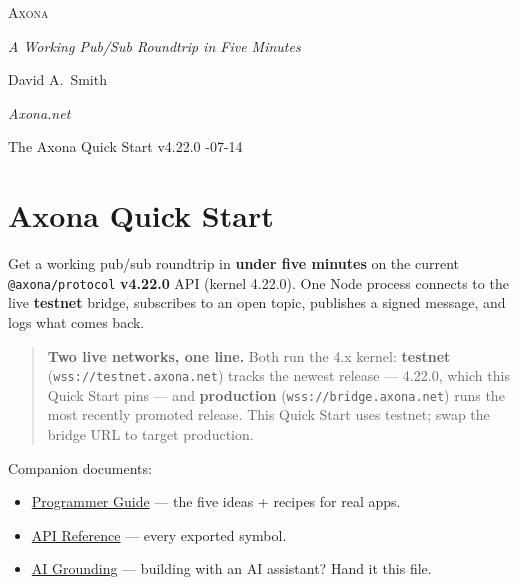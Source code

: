 \documentclass[
  nobib]{tufte-handout}
\author{}
\date{}
\providecommand{\tightlist}{%
  \setlength{\itemsep}{0pt}\setlength{\parskip}{0pt}}
\begin{document}
\thispagestyle{empty}
\null\vfill
\begin{center}
{\fontsize{48}{52}\selectfont \textsc{Axona}\par}
\vspace{0.6em}
{\Large\itshape A Working Pub/Sub Roundtrip in Five Minutes\par}
\vspace{4em}
{\large David A.~Smith\par}
{\itshape\small Axona.net\par}
\vspace{2em}
{\small The Axona Quick Start \quad v4.22.0 -07-14\par}
\end{center}
\vfill
\null
\newpage
\pagestyle{ndhtplain}
\thispagestyle{ndhtplain}
\setcounter{page}{1}

\section{Axona Quick Start}\label{axona-quick-start}

Get a working pub/sub roundtrip in \textbf{under five minutes} on the
current \texttt{@axona/protocol} \textbf{v4.22.0} API (kernel 4.22.0).
One Node process connects to the live \textbf{testnet} bridge,
subscribes to an open topic, publishes a signed message, and logs what
comes back.

\begin{quote}
\textbf{Two live networks, one line.} Both run the 4.x kernel:
\textbf{testnet} (\texttt{wss://testnet.axona.net}) tracks the newest
release --- 4.22.0, which this Quick Start pins --- and
\textbf{production} (\texttt{wss://bridge.axona.net}) runs the most
recently promoted release. This Quick Start uses testnet; swap the
bridge URL to target production.
\end{quote}

Companion documents:

\begin{itemize}
\tightlist
\item
  \href{Axona-Programmer-Guide-v4.22.0.md}{Programmer Guide} --- the
  five ideas + recipes for real apps.
\item
  \href{Axona-API-Reference-v4.22.0.md}{API Reference} --- every
  exported symbol.
\item
  \href{Axona-AI-Grounding-v4.22.0.md}{AI Grounding} --- building with
  an AI assistant? Hand it this file.
\end{itemize}
\end{document}
